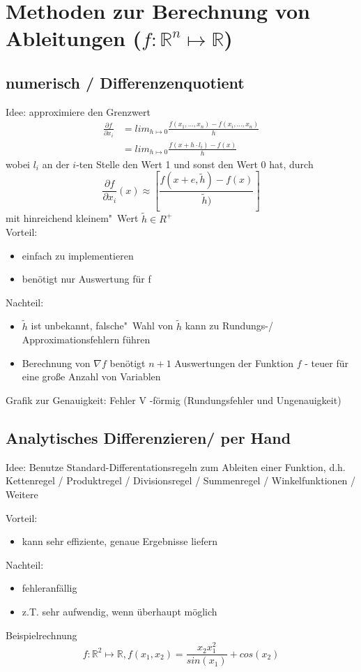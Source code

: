 \section{Methoden zur Berechnung von Ableitungen ($f: \mathbb{R}^n \mapsto \mathbb{R}$)}


\subsection{numerisch / Differenzenquotient}
\label{subsec:numerisch / Differenzenquotient}
Idee: approximiere den Grenzwert
\begin{align*}
\frac{\partial f}{\partial x_i} & = lim_{h\mapsto 0} \frac{f(x_1,\dots,x_n) - f(x_i,\dots,x_n)}{h}\\
 &= lim_{h\mapsto 0} \frac{f(x+h \cdot l_i) - f(x)}{h}
\end{align*}
wobei $l_i$ an der $i$-ten Stelle den Wert 1 und sonst den Wert 0 hat, durch 
$$\frac{\partial f}{\partial x_i}(x) \approx \left[\frac{f(x+e,\tilde h)-f(x)}{\tilde h)}\right]$$
mit \glqq hinreichend kleinem"\ Wert $\tilde h \in R^+$
\\
Vorteil:
\begin{itemize}
	\item einfach zu implementieren
	\item benötigt nur Auswertung für f
\end{itemize}
Nachteil:
\begin{itemize}
	\item $\tilde h$ ist unbekannt, \glqq falsche"\ Wahl von $\tilde h$ kann zu Rundungs-/ Approximationsfehlern führen
	\item Berechnung von $\nabla f$ benötigt $n+1$ Auswertungen der Funktion $f$ - teuer für eine große Anzahl von Variablen
\end{itemize}
Grafik zur Genauigkeit: Fehler V -förmig (Rundungsfehler und Ungenauigkeit)

\vspace{3cm}

\subsection{Analytisches Differenzieren/ per Hand}
Idee: Benutze Standard-Differentationsregeln zum Ableiten einer Funktion, d.h. Kettenregel / Produktregel / Divisionsregel / Summenregel / Winkelfunktionen / Weitere

\noindent Vorteil:
\begin{itemize}
	\item kann sehr effiziente, genaue Ergebnisse liefern
\end{itemize}
Nachteil:
\begin{itemize}
	\item fehleranfällig
	\item z.T. sehr aufwendig, wenn überhaupt möglich
\end{itemize}
Beispielrechnung
$$f:\mathbb{R}^2\mapsto\mathbb{R}, f(x_1,x_2) = \frac{x_2 x_1^2}{sin(x_1)}+cos(x_2)$$

